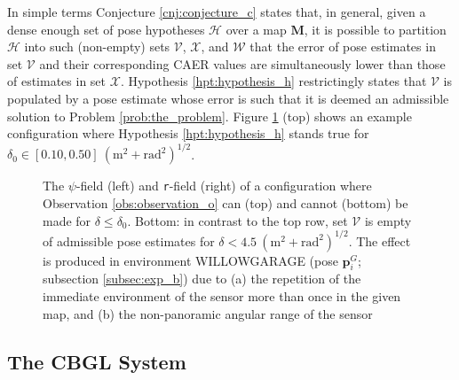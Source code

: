 In simple terms Conjecture \ref{cnj:conjecture_c} states that, in general,
given a dense enough set of pose hypotheses $\mathcal{H}$ over a map $\bm{M}$,
it is possible to partition $\mathcal{H}$ into such (non-empty) sets
$\mathcal{V}$, $\mathcal{X}$, and $\mathcal{W}$ that the error of pose
estimates in set $\mathcal{V}$ and their corresponding CAER values are
simultaneously lower than those of estimates in set $\mathcal{X}$. Hypothesis
\ref{hpt:hypothesis_h} restrictingly states that $\mathcal{V}$ is populated by
a pose estimate whose error is such that it is deemed an admissible solution to
Problem \ref{prob:the_problem}. Figure \ref{fig:h_and_h_not_fig} (top) shows
an example configuration where Hypothesis \ref{hpt:hypothesis_h}
stands true for $ \delta_0 \in [0.10, 0.50] \ (\text{m}^2 + \text{rad}^2)^{1/2}$.

\begin{figure}\hspace{0.5cm}
  
  \vspace{0.7cm}
  \caption{\small The $\psi$-field (left) and \texttt{r}-field (right) of a
           configuration where Observation \ref{obs:observation_o} can (top)
           and cannot (bottom) be made for $\delta \leq \delta_0$. Bottom:
           in contrast to the top row, set $\mathcal{V}$ is empty of admissible
           pose estimates for $\delta < 4.5 \ (\text{m}^2 +
           \text{rad}^2)^{1/2}$. The effect is produced in environment
           WILLOWGARAGE (pose $\bm{p}_{i}^G$; subsection \ref{subsec:exp_b})
           due to (a) the repetition of the immediate environment of the sensor
           more than once in the given map, and (b) the non-panoramic angular
           range of the sensor}
  \label{fig:h_and_h_not_fig}
\end{figure}


\subsection{The CBGL System}

